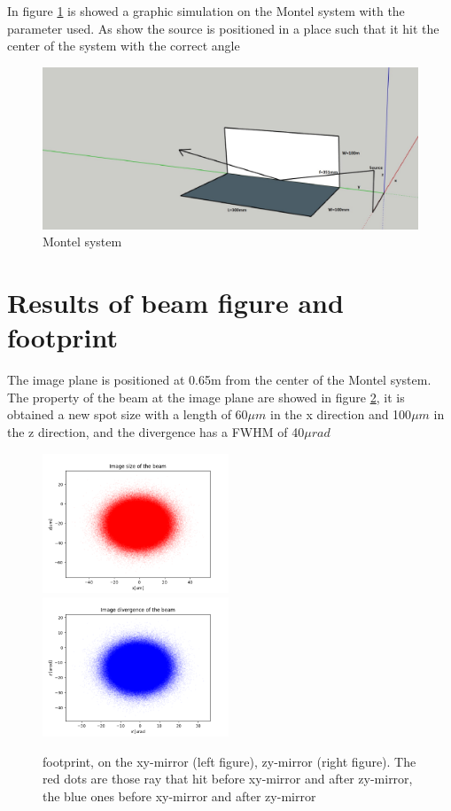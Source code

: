 \documentclass[a4paper]{article}
\begin{document}
In figure \ref{fig:Montel system} is showed a graphic simulation on the Montel system with the parameter used. As show the source is positioned in a place such that it hit the center of the system with the correct angle


\begin{figure}[H]
\centering
\includegraphics[width=1\textwidth]{MontelSystem.jpg}
\caption{\label{fig:Montel system} Montel system}
\end{figure}
\section{Results of beam figure and footprint}

The image plane is positioned at 0.65m from the center of the Montel system. The property of the beam at the image plane are showed in figure \ref{fig:image}, it is obtained a new spot size with a length of 60$\mu$$m$ in the x direction and 100$\mu$$m$ in the z direction, and the divergence has a FWHM of 40$\mu$$rad$


\begin{figure}[H]
\centering
\includegraphics[width=0.495\textwidth]{image_spot.png}
\includegraphics[width=0.495\textwidth]{image_divergence.png}
\caption{\label{fig:image} footprint, on the xy-mirror (left figure), zy-mirror (right figure). The red dots are those ray that hit before xy-mirror and after zy-mirror, the blue ones before xy-mirror and after zy-mirror}
\end{figure}
\end{document}
